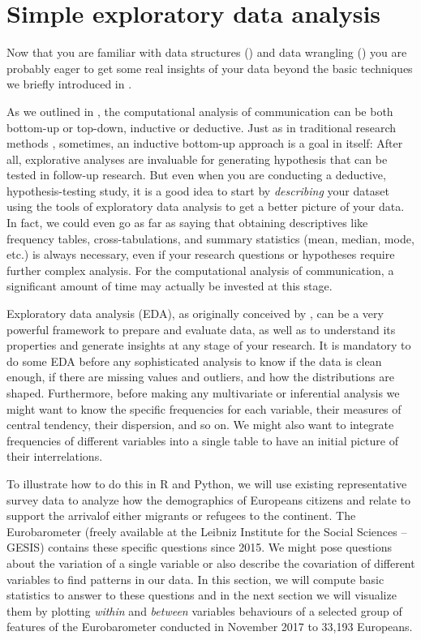\section{Simple exploratory data analysis}
\label{sec:simpleeda}

Now that you are familiar with data structures () and data wrangling () you are probably eager to get some real insights of your data beyond the basic techniques we briefly introduced in .

As we outlined in , the computational analysis
of communication can be both bottom-up or top-down, inductive or
deductive.  Just as in traditional research methods \cite[for an
  overview, see, for example,][]{Bryman2012}, sometimes, an inductive
bottom-up approach is a goal in itself: After all, explorative
analyses are invaluable for generating hypothesis that can be tested
in follow-up research. But even when you are conducting a deductive,
hypothesis-testing study, it is a good idea to start by
\emph{describing} your dataset using the tools of exploratory data
analysis to get a better picture of your data. In fact, we could even
go as far as saying that obtaining descriptives like frequency tables,
cross-tabulations, and summary statistics (mean, median, mode, etc.)
is always necessary, even if your research questions or hypotheses
require further complex analysis. For the computational analysis of
communication, a significant amount of time may actually be invested
at this stage.

Exploratory data analysis (EDA), as originally conceived by \citet{tukey1977exploratory}, can be a very powerful framework to prepare and evaluate data, as well as to understand its properties and generate insights at any stage of your research.
It is mandatory to do some EDA before any sophisticated analysis to know if the data is clean enough, if there are missing values and outliers, and how the distributions are shaped.
Furthermore, before making any multivariate or inferential analysis we might want to know the specific frequencies for each variable, their measures of central tendency, their dispersion, and so on. We might also want to integrate frequencies of different variables into a single table to have an initial picture of their interrelations.

To illustrate how to do this in R and Python, we will use existing representative survey data to analyze how the demographics of Europeans citizens and relate to support the arrivalof  either migrants or refugees to the continent. The Eurobarometer (freely available at the Leibniz Institute for the Social Sciences -- GESIS) contains these specific questions since 2015. We might pose questions about the variation of a single variable or also describe the covariation of different variables to find patterns in our data. In this section, we will compute basic statistics to answer to these questions and in the next section we will visualize them by plotting \textit{within} and \textit{between} variables behaviours of a selected group of features of the Eurobarometer conducted in November 2017 to 33,193 Europeans. 

